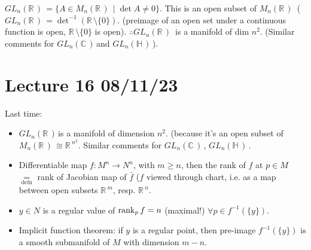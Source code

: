 \documentclass[12pt,a4paper]{article}
\newcommand{\rR}{\ensuremath{\mathbb{R}\,}}
\newcommand{\cC}{\ensuremath{\mathbb{C}\,}}
\newcommand{\hH}{\ensuremath{\mathbb{H}\,}}
\newcommand{\mnr}{\ensuremath{M_n(\rR)\,}}
\newcommand{\glnr}{\ensuremath{GL_n(\rR)\,}}
\newcommand{\glnc}{\ensuremath{GL_n(\cC)\,}}
\newcommand{\glnh}{\ensuremath{GL_n(\hH)\,}}
\begin{document}
$\glnr = \{A\in \mnr \mid \det A\neq 0\}$. This is an open subset of $\mnr$ ($\glnr = \det ^{-1}(\rR \setminus \{0\})$. (preimage of an open set under a continuous function is open, $\rR \setminus \{0\}$ is open). $\therefore \glnr$ is a manifold of dim $n^2$. (Similar comments for \glnc and \glnh).

\section{Lecture 16 08/11/23}

Last time:

\begin{itemize}
\item \glnr is a manifold of dimension $n^2$. (because it's an open subset of $\mnr\cong \rR^{n^2}$. Similar comments for \glnc, \glnh .
\item Differentiable map $f:M^n\to N^n$, with $m\geq n$, then the rank of $f$ at $p\in M$ $\underset{\text{defn}}{=}$ rank of Jacobian map of $\bar{f}$ ($f$ viewed through chart, i.e. as a map between open subsets $\rR^m$, resp. $\rR^n$.
\item $y\in N$ is a regular value of $\rank_p f = n$ (maximal!) $\forall p \in f^{-1}(\{y\})$.
\item Implicit function theorem: if $y$ is a regular point, then pre-image $f^{-1}(\{y\})$ is a smooth submanifold of $M$ with dimension $m-n$.
\end{itemize}
\end{document}
